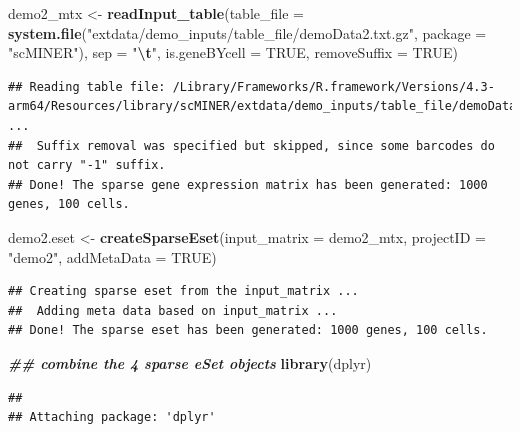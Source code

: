 \documentclass[
  12pt,
]{book}
\newenvironment{Shaded}{\begin{snugshade}}{\end{snugshade}}
\newcommand{\AttributeTok}[1]{\textcolor[rgb]{0.13,0.29,0.53}{#1}}
\newcommand{\ConstantTok}[1]{\textcolor[rgb]{0.56,0.35,0.01}{#1}}
\newcommand{\DocumentationTok}[1]{\textcolor[rgb]{0.56,0.35,0.01}{\textbf{\textit{#1}}}}
\newcommand{\FunctionTok}[1]{\textcolor[rgb]{0.13,0.29,0.53}{\textbf{#1}}}
\newcommand{\NormalTok}[1]{#1}
\newcommand{\OtherTok}[1]{\textcolor[rgb]{0.56,0.35,0.01}{#1}}
\newcommand{\SpecialCharTok}[1]{\textcolor[rgb]{0.81,0.36,0.00}{\textbf{#1}}}
\newcommand{\StringTok}[1]{\textcolor[rgb]{0.31,0.60,0.02}{#1}}
\begin{document}
\begin{Shaded}
\begin{Highlighting}[]
\NormalTok{demo2\_mtx }\OtherTok{\textless{}{-}} \FunctionTok{readInput\_table}\NormalTok{(}\AttributeTok{table\_file =} \FunctionTok{system.file}\NormalTok{(}\StringTok{"extdata/demo\_inputs/table\_file/demoData2.txt.gz"}\NormalTok{, }\AttributeTok{package =} \StringTok{"scMINER"}\NormalTok{), }\AttributeTok{sep =} \StringTok{"}\SpecialCharTok{\textbackslash{}t}\StringTok{"}\NormalTok{, }\AttributeTok{is.geneBYcell =} \ConstantTok{TRUE}\NormalTok{, }\AttributeTok{removeSuffix =} \ConstantTok{TRUE}\NormalTok{)}
\end{Highlighting}
\end{Shaded}

\begin{verbatim}
## Reading table file: /Library/Frameworks/R.framework/Versions/4.3-arm64/Resources/library/scMINER/extdata/demo_inputs/table_file/demoData2.txt.gz ...
##  Suffix removal was specified but skipped, since some barcodes do not carry "-1" suffix.
## Done! The sparse gene expression matrix has been generated: 1000 genes, 100 cells.
\end{verbatim}

\begin{Shaded}
\begin{Highlighting}[]
\NormalTok{demo2.eset }\OtherTok{\textless{}{-}} \FunctionTok{createSparseEset}\NormalTok{(}\AttributeTok{input\_matrix =}\NormalTok{ demo2\_mtx, }\AttributeTok{projectID =} \StringTok{"demo2"}\NormalTok{, }\AttributeTok{addMetaData =} \ConstantTok{TRUE}\NormalTok{)}
\end{Highlighting}
\end{Shaded}

\begin{verbatim}
## Creating sparse eset from the input_matrix ...
##  Adding meta data based on input_matrix ...
## Done! The sparse eset has been generated: 1000 genes, 100 cells.
\end{verbatim}

\begin{Shaded}
\begin{Highlighting}[]
\DocumentationTok{\#\# combine the 4 sparse eSet objects}
\FunctionTok{library}\NormalTok{(dplyr)}
\end{Highlighting}
\end{Shaded}

\begin{verbatim}
## 
## Attaching package: 'dplyr'
\end{verbatim}
\end{document}
